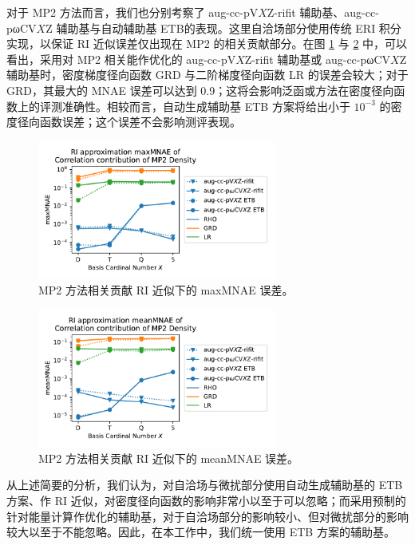 对于 MP2 方法而言，我们也分别考察了 aug-cc-pV$X$Z-rifit 辅助基、aug-cc-pωCV$X$Z 辅助基与自动辅助基 ETB的表现。这里自洽场部分使用传统 ERI 积分实现，以保证 RI 近似误差仅出现在 MP2 的相关贡献部分。在图 \ref{fig.4.MP2-RI-err} 与 \ref{fig.4.MP2-RI-mean} 中，可以看出，采用对 MP2 相关能作优化的 aug-cc-pV$X$Z-rifit 辅助基或 aug-cc-pωCV$X$Z 辅助基时，密度梯度径向函数 GRD 与二阶梯度径向函数 LR 的误差会较大；对于 GRD，其最大的 MNAE 误差可以达到 0.9；这将会影响泛函或方法在密度径向函数上的评测准确性。相较而言，自动生成辅助基 ETB 方案将给出小于 $10^{-3}$ 的密度径向函数误差；这个误差不会影响测评表现。

\begin{figure}[t]
  \centering
  \includegraphics[width=0.7\textwidth]{assets/MP2-RI-err.pdf}
  \caption[MP2 方法相关贡献 RI 近似下的 maxMNAE 误差]{MP2 方法相关贡献 RI 近似下的 maxMNAE 误差。}
  \label{fig.4.MP2-RI-err}
\end{figure}

\begin{figure}[t]
  \centering
  \includegraphics[width=0.7\textwidth]{assets/MP2-RI-mean.pdf}
  \caption[MP2 方法相关贡献 RI 近似下的 meanMNAE 误差]{MP2 方法相关贡献 RI 近似下的 meanMNAE 误差。}
  \label{fig.4.MP2-RI-mean}
\end{figure}

从上述简要的分析，我们认为，对自洽场与微扰部分使用自动生成辅助基的 ETB 方案、作 RI 近似，对密度径向函数的影响非常小以至于可以忽略；而采用预制的针对能量计算作优化的辅助基，对于自洽场部分的影响较小、但对微扰部分的影响较大以至于不能忽略。因此，在本工作中，我们统一使用 ETB 方案的辅助基。

